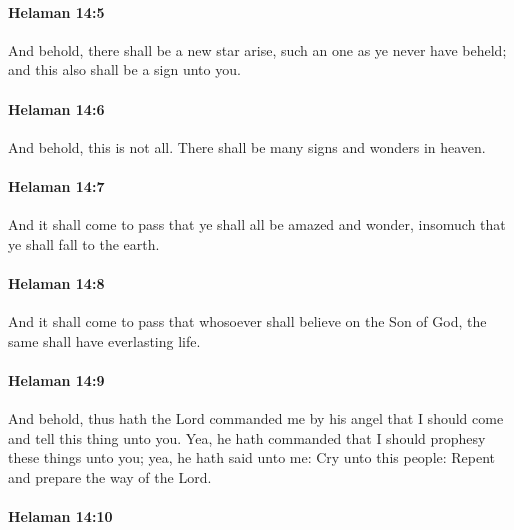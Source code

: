 		\paragraph{Helaman 14:5} %
			\label{HELAMAN-14-5}

			And behold, there shall be a new star arise,
			such an one as ye never have beheld;
			and this also shall be a sign unto you.

		\paragraph{Helaman 14:6} %
			\label{HELAMAN-14-6}

			And behold, this is not all.
			There shall be many signs and wonders in heaven.

		\paragraph{Helaman 14:7} %
			\label{HELAMAN-14-7}

			And it shall come to pass that ye shall all be amazed and wonder,
			insomuch that ye shall fall to the earth.

		\paragraph{Helaman 14:8} %
			\label{HELAMAN-14-8}

			And it shall come to pass that whosoever shall believe on the Son of God,
			the same shall have everlasting life.

		\paragraph{Helaman 14:9} %
			\label{HELAMAN-14-9}

			And behold, thus hath the Lord commanded me by his angel
			that I should come and tell this thing unto you.
			Yea, he hath commanded that I should prophesy these things unto you;
			yea, he hath said unto me:
			Cry unto this people:
			Repent and prepare the way of the Lord.

		\paragraph{Helaman 14:10} %
			\label{HELAMAN-14-10}

